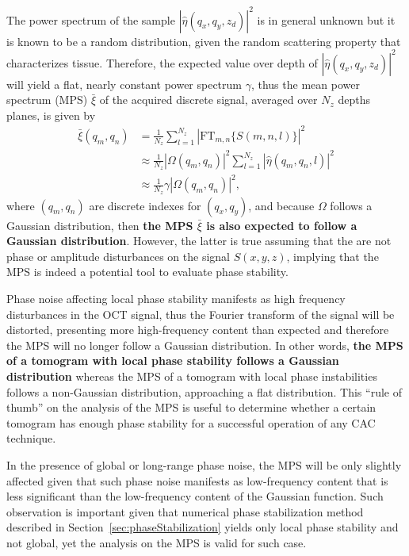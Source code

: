 The power spectrum of the sample $|\hat{\eta}(q_x, q_y, z_d)|^2$ is in general unknown but it is known to be a random distribution, given the random scattering property that characterizes tissue. Therefore, the expected value over depth of $|\hat{\eta}(q_x, q_y, z_d)|^2$ will yield a flat, nearly constant power spectrum $\gamma$, thus the mean power spectrum (MPS) $\bar{\xi}$ of the acquired discrete signal, averaged over $N_z$ depths planes, is given by
\begin{align}
    \bar{\xi}(q_m, q_n) &= \frac{1}{N_z}\sum_{l=1}^{N_z}\left|\text{FT}_{m,n}\{S(m,n,l)\}\right|^2\nonumber\\
    &\approx \frac{1}{N_z}|\Omega(q_m, q_n)|^2 \sum_{l=1}^{N_z} |\hat{\eta}(q_m, q_n, l)|^2 \nonumber\\
    &\approx \frac{1}{N_z}\gamma|\Omega(q_m, q_n)|^2,
\end{align}
where $(q_m,q_n)$ are discrete indexes for $(q_x,q_y)$, and because $\Omega$ follows a Gaussian distribution, then \textbf{the MPS $\bar{\xi}$ is also expected to follow a Gaussian distribution}. However, the latter is true assuming that the are not phase or amplitude disturbances on the signal $S(x,y,z)$, implying that the MPS is indeed a potential tool to evaluate phase stability.

Phase noise affecting local phase stability manifests as high frequency disturbances in the OCT signal, thus the Fourier transform of the signal will be distorted, presenting more high-frequency content than expected and therefore the MPS will no longer follow a Gaussian distribution. In other words, \textbf{the MPS of a tomogram with local phase stability follows a Gaussian distribution} whereas the MPS of a tomogram with local phase instabilities follows a non-Gaussian distribution, approaching a flat distribution. This ``rule of thumb'' on the analysis of the MPS is useful to determine whether a certain tomogram has enough phase stability for a successful operation of any CAC technique.

In the presence of global or long-range phase noise, the MPS will be only slightly affected given that such phase noise manifests as low-frequency content that is less significant than the low-frequency content of the Gaussian function. Such observation is important given that numerical phase stabilization method described in Section~\ref{sec:phaseStabilization} yields only local phase stability and not global, yet the analysis on the MPS is valid for such case.

